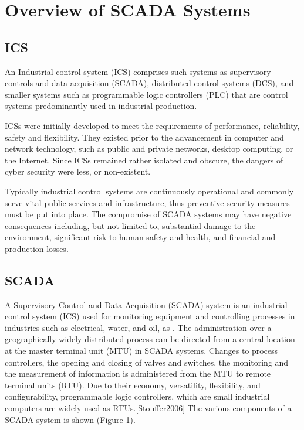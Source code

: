 \documentclass[12pt,]{article}
\begin{document}
\pagebreak

\section{Overview of SCADA Systems}\label{overview-of-scada-systems}

\subsection{ICS}\label{ics}

An Industrial control system (ICS) comprises such systems as supervisory
controls and data acquisition (SCADA), distributed control systems
(DCS), and smaller systems such as programmable logic controllers (PLC)
that are control systems predominantly used in industrial production.

ICSs were initially developed to meet the requirements of performance,
reliability, safety and flexibility. They existed prior to the
advancement in computer and network technology, such as public and
private networks, desktop computing, or the Internet. Since ICSs
remained rather isolated and obscure, the dangers of cyber security were
less, or non-existent.

Typically industrial control systems are continuously operational and
commonly serve vital public services and infrastructure, thus preventive
security measures must be put into place. The compromise of SCADA
systems may have negative consequences including, but not limited to,
substantial damage to the environment, significant risk to human safety
and health, and financial and production losses.

\subsection{SCADA}\label{scada}

A Supervisory Control and Data Acquisition (SCADA) system is an
industrial control system (ICS) used for monitoring equipment and
controlling processes in industries such as electrical, water, and oil,
as . The administration over a geographically widely distributed process
can be directed from a central location at the master terminal unit
(MTU) in SCADA systems. Changes to process controllers, the opening and
closing of valves and switches, the monitoring and the measurement of
information is administered from the MTU to remote terminal units (RTU).
Due to their economy, versatility, flexibility, and configurability,
programmable logic controllers, which are small industrial computers are
widely used as RTUs.{[}Stouffer2006{]} The various components of a SCADA
system is shown (Figure 1).
\end{document}
